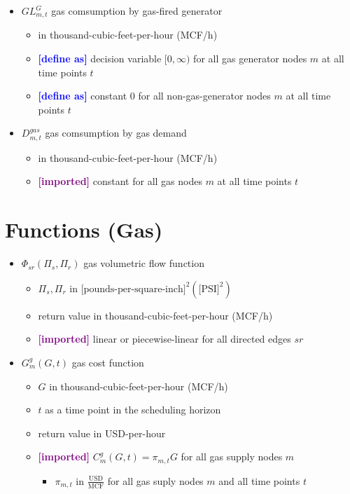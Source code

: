 \documentclass{article}
\newcommand{\define}{\textcolor{blue}{\textbf{[define as] }}}
\newcommand{\imported}{\textcolor{purple}{\textbf{[imported] }}}
\begin{document}
\begin{itemize}
\item $GL^G_{m,t}$ gas comsumption by gas-fired generator
  \begin{itemize}
  \item in thousand-cubic-feet-per-hour (MCF/h)
  \item \define decision variable $[0, \infty)$ for all gas generator nodes $m$
    at all time points $t$
  \item \define constant $0$ for all non-gas-generator nodes $m$ at all time
    points $t$
  \end{itemize}

\item $D^{gas}_{m,t}$ gas comsumption by gas demand
  \begin{itemize}
  \item in thousand-cubic-feet-per-hour (MCF/h)
  \item \imported constant for all gas nodes $m$ at all time points $t$
  \end{itemize}
\end{itemize}

\section{Functions (Gas)}
\begin{itemize}
\item $\Phi_{sr}(\Pi_s, \Pi_r)$ gas volumetric flow function
  \begin{itemize}
  \item $\Pi_s, \Pi_r$ in $\text{[pounds-per-square-inch]}^2 (\text{[PSI]}^2)$
  \item return value in thousand-cubic-feet-per-hour (MCF/h)
  \item \imported linear or piecewise-linear for all directed edges $sr$
  \end{itemize}

\item $G^g_m(G, t)$ gas cost function
  \begin{itemize}
  \item $G$ in thousand-cubic-feet-per-hour (MCF/h)
  \item $t$ as a time point in the scheduling horizon
  \item return value in USD-per-hour
  \item \imported $C_m^g(G, t) = \pi_{m,t} G$ for all gas supply nodes $m$
    \begin{itemize}
    \item $\pi_{m,t}$ in $\frac{\text{USD}}{\text{MCF}}$ for all gas suply nodes
      $m$ and all time points $t$
    \end{itemize}
  \end{itemize}
\end{itemize}
\end{document}
